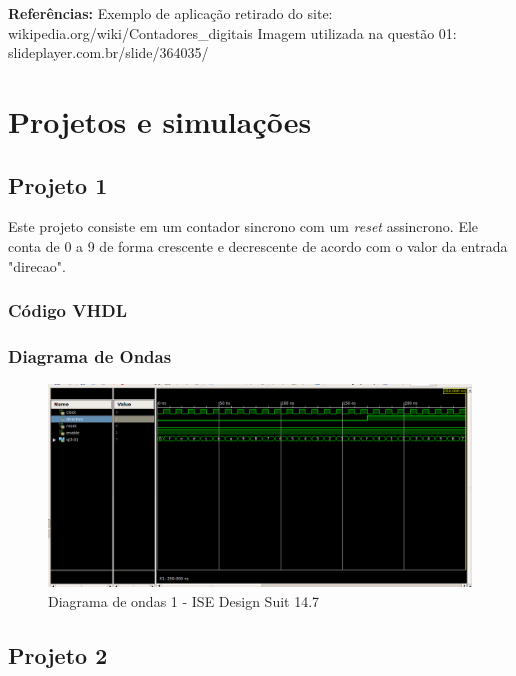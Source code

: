 \documentclass[12pts]{article}
\begin{document}
\singlespacing
\textbf{Referências:}
\singlespacing
Exemplo de aplicação retirado do site: wikipedia.org/wiki/Contadores\_digitais
Imagem utilizada na questão 01: slideplayer.com.br/slide/364035/
\singlespacing

\pagebreak
\section{Projetos e simulações}

\subsection{Projeto 1}

Este projeto consiste em um contador sincrono com um \textit{reset} assincrono. Ele conta de 0 a 9 de forma crescente e decrescente de acordo com o valor da entrada "direcao".

\subsubsection{Código VHDL}
                                                                                                                                     

\subsubsection{Diagrama de Ondas}
	\begin{figure}[!htb]
	  \centering
	  \includegraphics[scale=0.38]{imagens/onda_projeto_1.png}
	  \caption{Diagrama de ondas 1 - ISE Design Suit 14.7}
	  \label{figRotulo}
	\end{figure}

\pagebreak
\subsection{Projeto 2}
\end{document}
